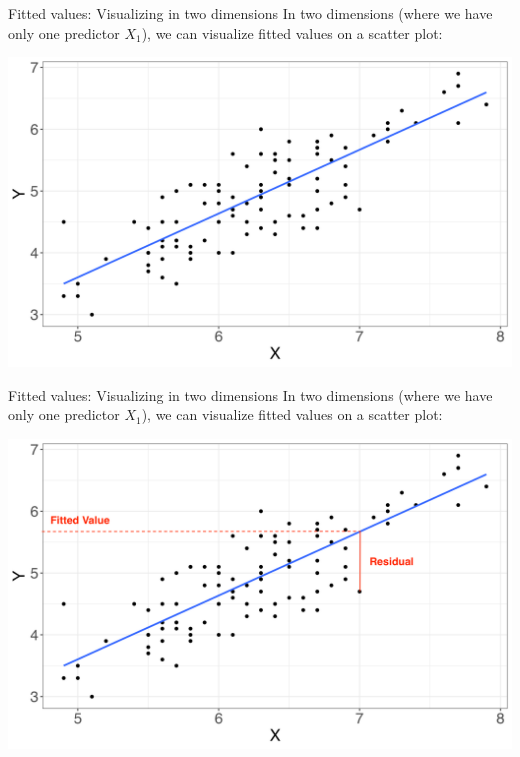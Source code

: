 \documentclass[10pt,t]{beamer}
\begin{document}
\begin{frame}{Fitted values: Visualizing in two dimensions}
In two dimensions (where we have only one predictor $X_1$), we can visualize fitted values on a scatter plot:
\vspace{0.3cm}

\centering \includegraphics[scale=0.4]{figures/fitted_vals1.png}
\end{frame}

\begin{frame}{Fitted values: Visualizing in two dimensions}
In two dimensions (where we have only one predictor $X_1$), we can visualize fitted values on a scatter plot:
\vspace{0.3cm}

\centering \includegraphics[scale=0.4]{figures/fitted_vals2.png}
\end{frame}
\end{document}
